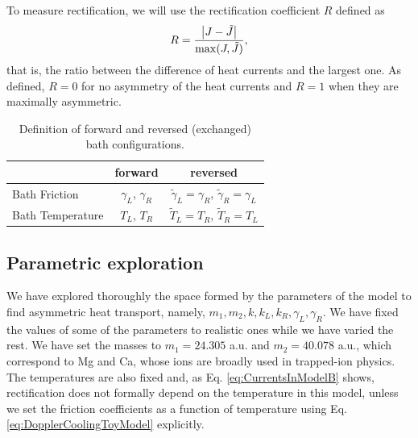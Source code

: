 To measure rectification, we will use the rectification coefficient $R$ defined as
%
\begin{equation}
  R = \frac{\abs{J-\tilde{J}}}{\max(J,\tilde{J})},
  \label{eq:Rectification}
\end{equation}
%
that is, the ratio between the difference of heat currents and the largest one. As defined, $R=0$ for no asymmetry of the heat currents and $R=1$ when they are maximally asymmetric.

\begin{table}[]
\caption{Definition of forward and reversed (exchanged) bath configurations.}
\begin{tabular}{lcc}
\hline
                 & forward                & reversed                                                       \\ \hline
Bath Friction    & $\gamma_L$, $\gamma_R$ & $\tilde{\gamma}_L =\gamma_R $,  $\tilde{\gamma}_R =\gamma_L $   \\
Bath Temperature & $T_L$, $T_R$           & $\tilde{T}_L =T_R $,  $\tilde{T}_R =T_L $                     \\
\hline
\end{tabular}
\label{tab:reversed_bath}
\end{table}

\subsection{Parametric exploration}

We have explored thoroughly the space formed by the parameters of the model to find asymmetric heat transport, namely, $m_1,m_2,k,k_L,k_R,\gamma_L,\gamma_R$. We have fixed the values of some of the parameters to realistic ones while we have varied the rest. We have set the masses to $m_1 = 24.305$ a.u. and $m_2 = 40.078$ a.u., which correspond to Mg and Ca, whose ions are broadly used in trapped-ion physics. The temperatures are also fixed and, as Eq. \eqref{eq:CurrentsInModelB} shows, rectification does not formally depend on the temperature in this model, unless we set the friction coefficients as a function of temperature using Eq. \eqref{eq:DopplerCoolingToyModel} explicitly.


